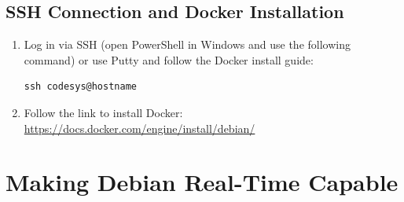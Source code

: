 \documentclass[a4paper,12pt]{article}
\begin{document}
\subsection{SSH Connection and Docker Installation}
\begin{enumerate}
\item Log in via SSH (open PowerShell in Windows and use the following command) or use Putty and follow the Docker install guide:
\begin{lstlisting}
ssh codesys@hostname
\end{lstlisting}
\item Follow the link to install Docker: \url{https://docs.docker.com/engine/install/debian/}
\end{enumerate}

\newpage
\section{Making Debian Real-Time Capable}
\end{document}
